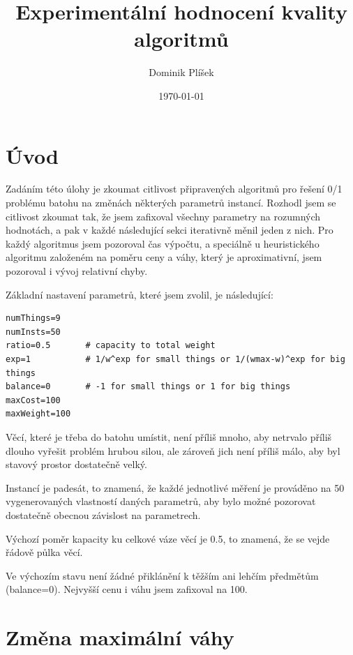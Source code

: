 \documentclass[12pt,a4paper]{article}
\begin{document}
\title{Experimentální hodnocení kvality algoritmů}
\author{Dominik Plíšek}
\date{\dmyyyydate\today}
\maketitle

\tableofcontents


\section*{Úvod}

Zadáním této úlohy je zkoumat citlivost připravených algoritmů pro řešení 0/1 problému batohu na změnách některých parametrů instancí. Rozhodl jsem se citlivost zkoumat tak, že jsem zafixoval všechny parametry na rozumných hodnotách, a pak v každé následující sekci iterativně měnil jeden z nich. Pro každý algoritmus jsem pozoroval čas výpočtu, a speciálně u heuristického algoritmu založeném na poměru ceny a váhy, který je aproximativní, jsem pozoroval i vývoj relativní chyby. 

Základní nastavení parametrů, které jsem zvolil, je následující:

\begin{verbatim}
numThings=9
numInsts=50
ratio=0.5       # capacity to total weight
exp=1           # 1/w^exp for small things or 1/(wmax-w)^exp for big things
balance=0       # -1 for small things or 1 for big things
maxCost=100
maxWeight=100
\end{verbatim}

Věcí, které je třeba do batohu umístit, není příliš mnoho, aby netrvalo příliš dlouho vyřešit problém hrubou silou, ale zároveň jich není příliš málo, aby byl stavový prostor dostatečně velký.

Instancí je padesát, to znamená, že každé jednotlivé měření je prováděno na 50 vygenerovaných vlastností daných parametrů, aby bylo možné pozorovat dostatečně obecnou závislost na parametrech.

Výchozí poměr kapacity ku celkové váze věcí je 0.5, to znamená, že se vejde řádově půlka věcí.

Ve výchozím stavu není žádné přiklánění k těžším ani lehčím předmětům (balance=0). Nejvyšší cenu i váhu jsem zafixoval na 100.






\section{Změna maximální váhy}
\label{maxWeight}
\end{document}
